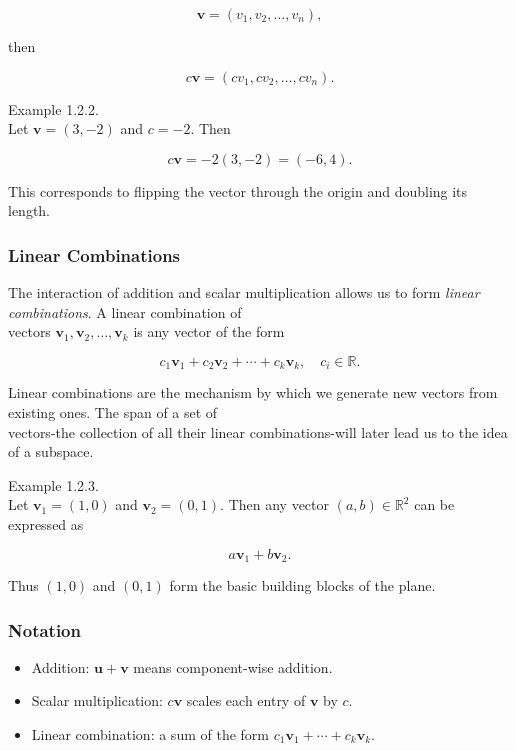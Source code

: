 \documentclass[
  12pt,
  a4paper,
]{article}
\begin{document}
\[\mathbf{v} = (v_1, v_2, \dots, v_n),\]

then

\[c \mathbf{v} = (c v_1, c v_2, \dots, c v_n).\]

Example 1.2.2.\\
Let \(\mathbf{v} = (3, -2)\) and \(c = -2\). Then

\[c\mathbf{v} = -2(3, -2) = (-6, 4).\]

This corresponds to flipping the vector through the origin and doubling
its length.

\subsubsection{Linear Combinations}\label{linear-combinations}

The interaction of addition and scalar multiplication allows us to form
\emph{linear combinations}. A linear combination of\\
vectors \(\mathbf{v}_1, \mathbf{v}_2, \dots, \mathbf{v}_k\) is any
vector of the form

\[c_1 \mathbf{v}_1 + c_2 \mathbf{v}_2 + \cdots + c_k \mathbf{v}_k, \quad c_i \in \mathbb{R}.\]

Linear combinations are the mechanism by which we generate new vectors
from existing ones. The span of a set of\\
vectors-the collection of all their linear combinations-will later lead
us to the idea of a subspace.

Example 1.2.3.\\
Let \(\mathbf{v}_1 = (1,0)\) and \(\mathbf{v}_2 = (0,1)\). Then any
vector \((a,b)\in\mathbb{R}^2\) can be expressed as

\[a\mathbf{v}_1 + b\mathbf{v}_2.\]

Thus \((1,0)\) and \((0,1)\) form the basic building blocks of the
plane.

\subsubsection{Notation}\label{notation-2}

\begin{itemize}
\item
  Addition: \(\mathbf{u} + \mathbf{v}\) means component-wise addition.
\item
  Scalar multiplication: \(c\mathbf{v}\) scales each entry of
  \(\mathbf{v}\) by \(c\).
\item
  Linear combination: a sum of the form
  \(c_1 \mathbf{v}_1 + \cdots + c_k \mathbf{v}_k\).
\end{itemize}
\end{document}
